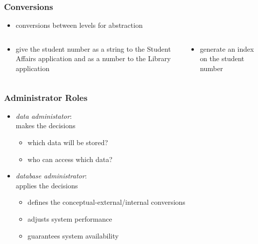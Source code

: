 \documentclass[dvipsnames]{beamer}
\theoremstyle{plain}
\begin{document}
\begin{frame}
  \frametitle{Conversions}

  \begin{itemize}
    \item conversions between levels for abstraction
  \end{itemize}

  \pause
  \begin{columns}[t]
    \begin{example}
      \begin{itemize}
        \item give the student number as a string to the Student Affairs
          application and as a number to the Library application
      \end{itemize}
    \end{example}

    \pause
    \begin{example}
      \begin{itemize}
        \item generate an index on the student number
      \end{itemize}
    \end{example}
  \end{columns}
\end{frame}

\begin{frame}
  \frametitle{Administrator Roles}

  \begin{itemize}
    \item \emph{data administator}:\\
      makes the decisions
    \begin{itemize}
      \item which data will be stored?
      \item who can access which data?
    \end{itemize}

    \pause
    \bigskip
    \item \emph{database administrator}:\\
      applies the decisions
    \begin{itemize}
      \item defines the conceptual-external/internal conversions
      \item adjusts system performance
      \item guarantees system availability
    \end{itemize}
  \end{itemize}
\end{frame}
\end{document}
